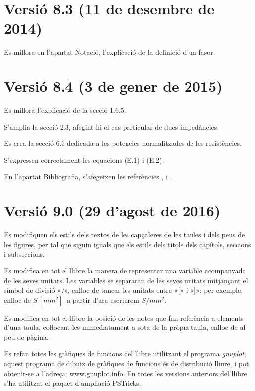\section*{Versió 8.3 (11 de desembre de 2014)}

Es millora en l'apartat Notació, l'explicació de la definició d'un fasor.


\section*{Versió 8.4 (3 de gener de 2015)}

Es millora l'explicació de la secció 1.6.5.

S'amplia la secció 2.3, afegint-hi el cas particular de dues impedàncies.

Es crea la secció 6.3 dedicada a les potencies normalitzades de les resistències.

S'expressen correctament les equacions (E.1) i (E.2).

En l'apartat Bibliografia, s'afegeixen les referències \cite{AGVS}, \cite{JSch} i \cite{RRop}.


\section*{Versió 9.0 (29 d’agost de 2016)}

Es modifiquen els estils dels textos de les capçaleres de les taules i dels peus de les figures, per tal que siguin iguals que els estils dels títols dels capítols, seccions i subseccions.

Es modifica en tot el llibre la manera de representar una variable acompanyada de les seves unitats. Les variables se separaran de les seves unitats mitjançant el símbol de divisió «/», enlloc de tancar les unitats entre «[» i  «]»; per exemple, enlloc de
$S\si{\,[mm^2]}$, a partir d'ara escriurem $S/\si{mm^2}$.

Es modifica en tot el llibre la posició de les notes que fan referència a elements d'una taula, coŀlocant-les immediatament a sota de la pròpia taula, enlloc de al peu de pàgina.

Es refan totes les gràfiques de funcions del llibre utilitzant el programa \emph{gnuplot}; aquest programa de dibuix de gràfiques de funcions és de distribució lliure, i pot obtenir-se a l'adreça: \href{http://www.gnuplot.info/}{www.gnuplot.info}. En totes les versions anteriors del llibre s'ha utilitzat el paquet d'ampliació  PSTricks.

